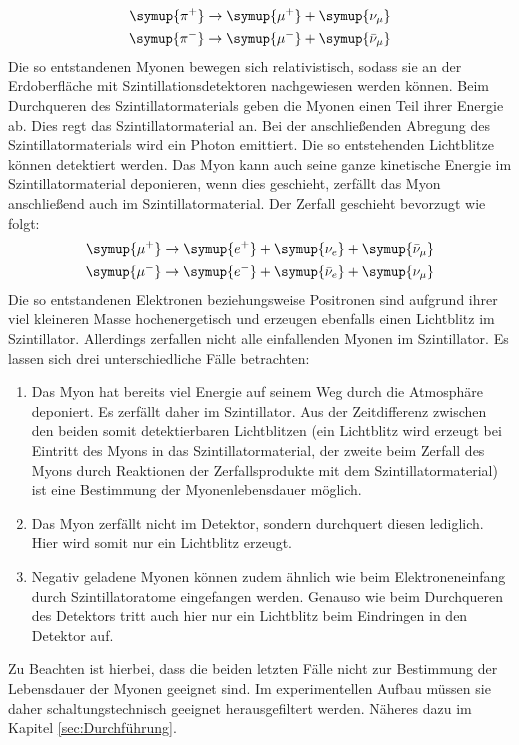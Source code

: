 \begin{align}
  \symup{\pi^+}\to\symup{\mu^+}+\symup{\nu_\mu}\\
  \symup{\pi^-}\to\symup{\mu^-}+\symup{\bar{\nu}_\mu}
\end{align}
Die so entstandenen Myonen bewegen sich relativistisch, sodass sie an der Erdoberfläche mit Szintillationsdetektoren nachgewiesen werden können.
Beim Durchqueren des Szintillatormaterials geben die Myonen einen Teil ihrer Energie ab. Dies regt das Szintillatormaterial an. Bei der anschließenden Abregung des Szintillatormaterials wird ein Photon emittiert.
Die so entstehenden Lichtblitze können detektiert werden.
Das Myon kann auch seine ganze kinetische Energie im Szintillatormaterial deponieren, wenn dies geschieht, zerfällt das Myon anschließend auch im Szintillatormaterial.
Der Zerfall geschieht bevorzugt wie folgt:
\begin{align}
  \symup{\mu^+}\to\symup{e^+}+\symup{\nu_e}+\symup{\bar{\nu}_\mu} \\
  \symup{\mu^-}\to\symup{e^-}+\symup{\bar{\nu}_e}+\symup{\nu_\mu}
\end{align}
Die so entstandenen Elektronen beziehungsweise Positronen sind aufgrund ihrer viel kleineren Masse hochenergetisch und erzeugen ebenfalls einen Lichtblitz im Szintillator.
Allerdings zerfallen nicht alle einfallenden Myonen im Szintillator.
Es lassen sich drei unterschiedliche Fälle betrachten:
\begin{enumerate}
  \item Das Myon hat bereits viel Energie auf seinem Weg durch die Atmosphäre deponiert. Es zerfällt daher im Szintillator. Aus der Zeitdifferenz zwischen den beiden somit detektierbaren Lichtblitzen (ein Lichtblitz wird erzeugt bei Eintritt des Myons in das Szintillatormaterial, der zweite beim Zerfall des Myons durch Reaktionen der Zerfallsprodukte mit dem Szintillatormaterial) ist eine Bestimmung der Myonenlebensdauer möglich.
  \item Das Myon zerfällt nicht im Detektor, sondern durchquert diesen lediglich. Hier wird somit nur ein Lichtblitz erzeugt.
  \item Negativ geladene Myonen können zudem ähnlich wie beim Elektroneneinfang durch Szintillatoratome eingefangen werden. Genauso wie beim Durchqueren des Detektors tritt auch hier nur ein Lichtblitz beim Eindringen in den Detektor auf.
\end{enumerate}

Zu Beachten ist hierbei, dass die beiden letzten Fälle nicht zur Bestimmung der Lebensdauer der Myonen geeignet sind. Im experimentellen Aufbau müssen sie daher schaltungstechnisch geeignet herausgefiltert werden. Näheres dazu im Kapitel \ref{sec:Durchführung}.

